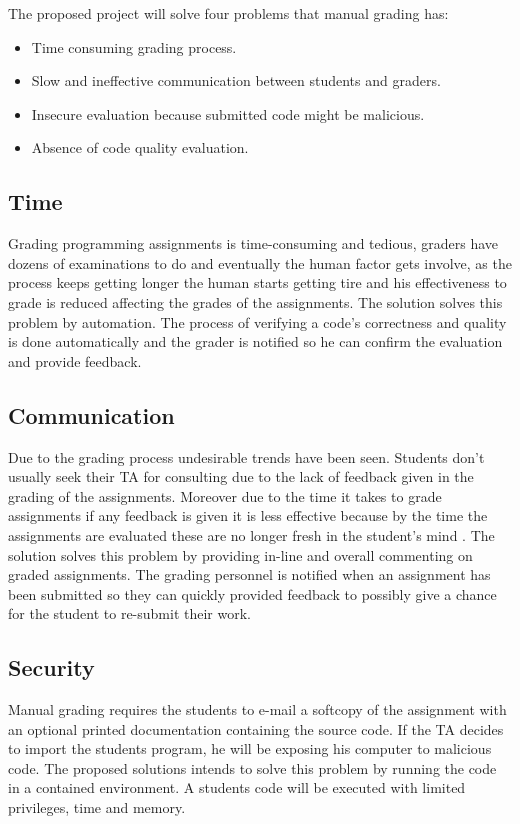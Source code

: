 The proposed project will solve four problems that manual grading has:
\begin{itemize}
\item Time consuming grading process.
\item Slow and ineffective communication between students and graders.
\item Insecure evaluation because submitted code might be malicious.
\item Absence of code quality evaluation.
\end{itemize}

\subsection{Time}
Grading programming assignments is time-consuming and tedious, graders have
dozens of examinations to do and eventually the human factor gets involve, as
the process keeps getting longer the human starts getting tire and his
effectiveness to grade is reduced affecting the grades of the assignments.
The solution solves this problem by automation. The process of verifying a
code's correctness and quality is done automatically and the grader is notified
so he can confirm the evaluation and provide feedback.
\subsection{Communication}
Due to the grading process undesirable trends have been seen. Students don't
usually seek their TA for consulting due to the lack of feedback given in the
grading of the assignments. Moreover due to the time it takes to grade
assignments if any feedback is given it is less effective because by the time
the assignments are evaluated these are no longer fresh in the student's mind
\cite{Cheang2003}. The solution solves this problem by providing in-line and
overall commenting on graded assignments. The grading personnel is notified when
an assignment has been submitted so they can quickly provided feedback to
possibly give a chance for the student to re-submit their work.
\subsection{Security}
Manual grading requires the students to e-mail a softcopy of the assignment with
an optional printed documentation containing the source code. If the TA decides
to import the students program, he will be exposing his computer to
malicious code. The proposed solutions intends to solve this problem by running
the code in a contained environment. A students code will be executed with
limited privileges, time and memory.
